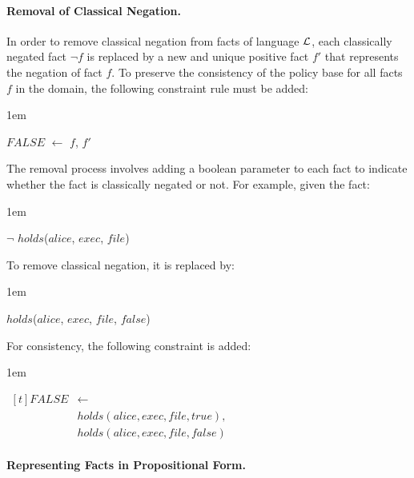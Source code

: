 \documentclass[global,twocolumn,final]{svjour}
\newenvironment{vquote}
  {\begin{list}{}{\leftmargin 1em}\item[]}
  {\end{list}}
\begin{document}
        \paragraph{Removal of Classical Negation.}

          In order to remove classical negation from facts of language
          ${\cal L}$, each classically negated fact $\lnot$$f$ is replaced by
          a new and unique positive fact $f'$ that represents the negation of
          fact $f$. To preserve the consistency of the policy base for all
          facts $f$ in the domain, the following constraint rule must be added:

          \begin{vquote}
            $FALSE$ $\leftarrow$ $f$, $f'$
          \end{vquote}

          The removal process involves adding a boolean parameter to each fact
          to indicate whether the fact is classically negated or not. For
          example, given the fact:

          \begin{vquote}
            $\lnot$ $holds$($alice$, $exec$, $file$)
          \end{vquote}

          To remove classical negation, it is replaced by:

          \begin{vquote}
            $holds$($alice$, $exec$, $file$, $false$)
          \end{vquote}

          For consistency, the following constraint is added:

          \begin{vquote}
            \begin{math}
              \begin{aligned}[t]
                FALSE & \leftarrow \\
                & holds(alice, exec, file, true), \\
                & holds(alice, exec, file, false)
              \end{aligned}
            \end{math}
          \end{vquote}

        \paragraph{Representing Facts in Propositional Form.}
\end{document}
